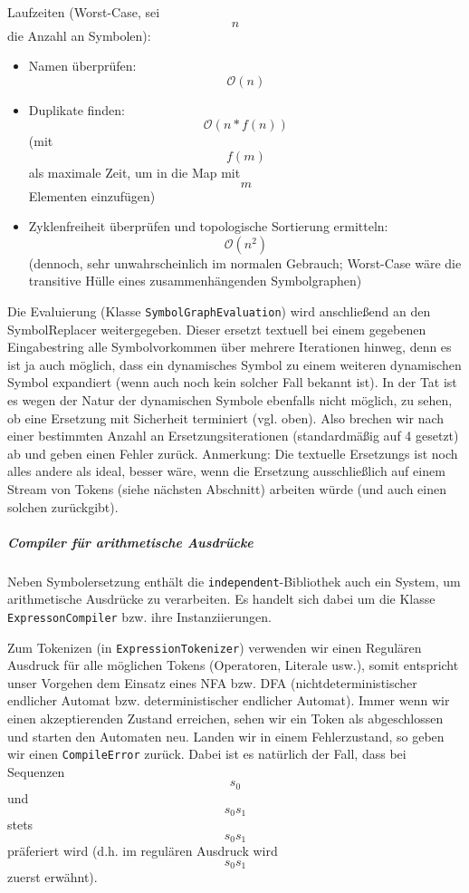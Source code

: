 Laufzeiten (Worst-Case, sei $$n$$ die Anzahl an Symbolen): \begin{itemize} \item
Namen überprüfen: $$\mathcal{O}(n)$$ \item Duplikate finden:
$$\mathcal{O}(n*f(n))$$ (mit $$f(m)$$ als maximale Zeit, um in die Map mit $$m$$
Elementen einzufügen) \item Zyklenfreiheit überprüfen und topologische
Sortierung ermitteln: $$\mathcal{O}(n^2)$$ (dennoch, sehr unwahrscheinlich im
normalen Gebrauch; Worst-Case wäre die transitive Hülle eines zusammenhängenden
Symbolgraphen) \end{itemize}

Die Evaluierung (Klasse \texttt{SymbolGraphEvaluation}) wird anschließend an den
SymbolReplacer weitergegeben. Dieser ersetzt textuell bei einem gegebenen
Eingabestring alle Symbolvorkommen über mehrere Iterationen hinweg, denn es ist
ja auch möglich, dass ein dynamisches Symbol zu einem weiteren dynamischen
Symbol expandiert (wenn auch noch kein solcher Fall bekannt ist). In der Tat ist
es wegen der Natur der dynamischen Symbole ebenfalls nicht möglich, zu sehen, ob
eine Ersetzung mit Sicherheit terminiert (vgl. oben). Also brechen wir nach
einer bestimmten Anzahl an Ersetzungsiterationen (standardmäßig auf 4 gesetzt)
ab und geben einen Fehler zurück. Anmerkung: Die textuelle Ersetzungs ist noch
alles andere als ideal, besser wäre, wenn die Ersetzung ausschließlich auf einem
Stream von Tokens (siehe nächsten Abschnitt) arbeiten würde (und auch einen
solchen zurückgibt).

\subparagraph{Compiler für arithmetische Ausdrücke} Neben Symbolersetzung
enthält die \texttt{independent}-Bibliothek auch ein System, um arithmetische
Ausdrücke zu verarbeiten. Es handelt sich dabei um die Klasse
\texttt{ExpressonCompiler} bzw. ihre Instanziierungen.

Zum Tokenizen (in \texttt{ExpressionTokenizer}) verwenden wir einen Regulären
Ausdruck für alle möglichen Tokens (Operatoren, Literale usw.), somit entspricht
unser Vorgehen dem Einsatz eines NFA bzw. DFA (nichtdeterministischer endlicher
Automat bzw. deterministischer endlicher Automat). Immer wenn wir einen
akzeptierenden Zustand erreichen, sehen wir ein Token als abgeschlossen und
starten den Automaten neu. Landen wir in einem Fehlerzustand, so geben wir einen
\texttt{CompileError} zurück. Dabei ist es natürlich der Fall, dass bei
Sequenzen $$s_0$$ und $$s_0s_1$$ stets $$s_0s_1$$ präferiert wird (d.h. im
regulären Ausdruck wird $$s_0s_1$$ zuerst erwähnt).

